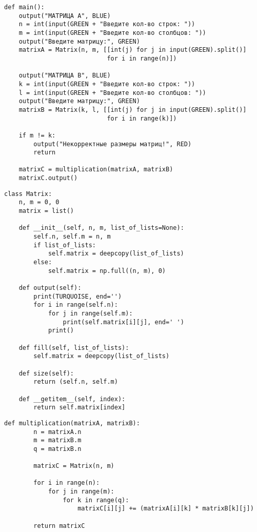 \begin{lstlisting}[label=some-code,caption=Главная функция main]
def main():
    output("МАТРИЦА A", BLUE)
    n = int(input(GREEN + "Введите кол-во строк: "))
    m = int(input(GREEN + "Введите кол-во столбцов: "))
    output("Введите матрицу:", GREEN)
    matrixA = Matrix(n, m, [[int(j) for j in input(GREEN).split()]
                            for i in range(n)])

    output("МАТРИЦА B", BLUE)
    k = int(input(GREEN + "Введите кол-во строк: "))
    l = int(input(GREEN + "Введите кол-во столбцов: "))
    output("Введите матрицу:", GREEN)
    matrixB = Matrix(k, l, [[int(j) for j in input(GREEN).split()]
                            for i in range(k)])

    if m != k:
        output("Некорректные размеры матриц!", RED)
        return

    matrixC = multiplication(matrixA, matrixB)
    matrixC.output()
\end{lstlisting}

\begin{lstlisting}[label=some-code,caption=Класс matrix]
class Matrix:
    n, m = 0, 0
    matrix = list()

    def __init__(self, n, m, list_of_lists=None):
        self.n, self.m = n, m
        if list_of_lists:
            self.matrix = deepcopy(list_of_lists)
        else:
            self.matrix = np.full((n, m), 0)

    def output(self):
        print(TURQUOISE, end='')
        for i in range(self.n):
            for j in range(self.m):
                print(self.matrix[i][j], end=' ')
            print()

    def fill(self, list_of_lists):
        self.matrix = deepcopy(list_of_lists)

    def size(self):
        return (self.n, self.m)

    def __getitem__(self, index):
        return self.matrix[index]
\end{lstlisting}

\begin{lstlisting}[label=some-code,caption=Стандарный алгоритм умножения матриц]
    def multiplication(matrixA, matrixB):
        n = matrixA.n
        m = matrixB.m
        q = matrixB.n

        matrixC = Matrix(n, m)

        for i in range(n):
            for j in range(m):
                for k in range(q):
                    matrixC[i][j] += (matrixA[i][k] * matrixB[k][j])

        return matrixC
\end{lstlisting}

